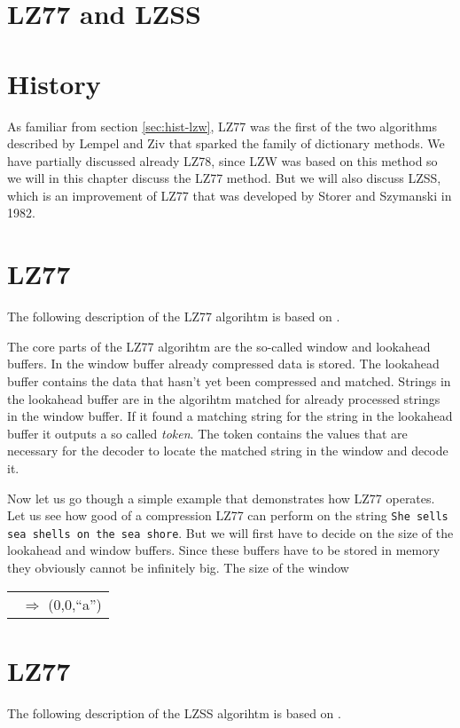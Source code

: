 \begin{comment}
  
\end{comment}

\section{LZ77 and LZSS}
\label{sec:lz77-lzss}

\section{History}

As familiar from section \ref{sec:hist-lzw}, LZ77 was the first of the
two algorithms described by Lempel and Ziv that sparked the family of
dictionary methods. We have partially discussed already LZ78, since
LZW was based on this method so we will in this chapter discuss the
LZ77 method. But we will also discuss LZSS, which is an improvement of
LZ77 that was developed by Storer and Szymanski in 1982.

\section{LZ77}

The following description of the LZ77 algorihtm is based on
\cite{Salomon:2004:DCC,mark1996data_compression_book,mcfadden92:_hackin_data_compr_ziv_lempel}.

\newcommand{\lzonestate}[5]{%
  \framebox{\texttt{#1}}\framebox{\texttt{#2}}\ $\Rightarrow$ (#3,#4,``#5'')\\}

The core parts of the LZ77 algorihtm are the so-called window and
lookahead buffers. In the window buffer already compressed data is
stored. The lookahead buffer contains the data that hasn't yet been
compressed and matched. Strings in the lookahead buffer are in the
algorihtm matched for already processed strings in the window
buffer. If it found a matching string for the string in the lookahead
buffer it outputs a so called \textit{token}. The token contains the
values that are necessary for the decoder to locate the matched
string in the window and decode it.

Now let us go though a simple example that demonstrates how LZ77
operates. Let us see how good of a compression LZ77 can perform on the
string \texttt{She sells sea shells on the sea shore}. But we will
first have to decide on the size of the lookahead and window
buffers. Since these buffers have to be stored in memory they
obviously cannot be infinitely big. The size of the window 

\begin{tabular}{l}
  \lzonestate{\phantom{l}}{She sells sea shells on the sea shore}{0}{0}{a}
\end{tabular}

\section{LZ77}

The following description of the LZSS algorihtm is based on
\cite{Salomon:2004:DCC,mark1996data_compression_book,mcfadden92:_hackin_data_compr_lzss,okumura:_data_compr_algor_larc_lharc}.
